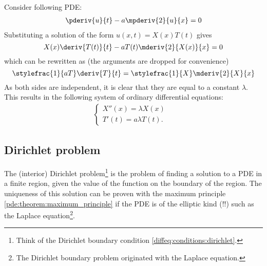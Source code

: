     \begin{example}
        Consider following PDE:
        \begin{gather}
            \pderiv{u}{t} - a\mpderiv{2}{u}{x} = 0
        \end{gather}
        Substituting a solution of the form $u(x, t) = X(x)T(t)$ gives \[X(x)\deriv{T(t)}{t} - aT(t)\mderiv{2}{X(x)}{x} = 0\] which can be rewritten as (the arguments are dropped for convenience) \[\stylefrac{1}{aT}\deriv{T}{t} = \stylefrac{1}{X}\mderiv{2}{X}{x}\] As both sides are independent, it is clear that they are equal to a constant $\lambda$. This results in the following system of ordinary differential equations:
        \begin{gather}
            \begin{cases}
                X''(x) = \lambda X(x)&\\
                T'(t) = a\lambda T(t).&
            \end{cases}
        \end{gather}
    \end{example}

\subsection{Dirichlet problem}

    The (interior) Dirichlet problem\footnote{Think of the Dirichlet boundary condition \ref{diffeq:conditions:dirichlet}.} is the problem of finding a solution to a PDE in a finite region, given the value of the function on the boundary of the region. The uniqueness of this solution can be proven with the maximum principle \ref{pde:theorem:maximum_principle} if the PDE is of the elliptic kind (!!) such as the Laplace equation\footnote{The Dirichlet boundary problem originated with the Laplace equation.}.



